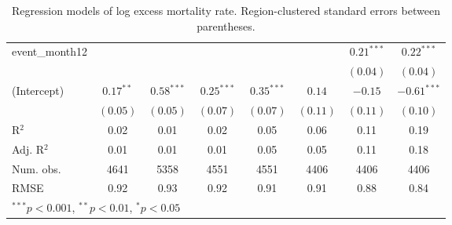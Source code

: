 \begin{table}
\begin{center}
\begin{tabular}{l c c c c c c c }
event\_month12     &              &              &              &              &              & $0.21^{***}$ & $0.22^{***}$  \\
                   &              &              &              &              &              & $(0.04)$     & $(0.04)$      \\
(Intercept)        & $0.17^{**}$  & $0.58^{***}$ & $0.25^{***}$ & $0.35^{***}$ & $0.14$       & $-0.15$      & $-0.61^{***}$ \\
                   & $(0.05)$     & $(0.05)$     & $(0.07)$     & $(0.07)$     & $(0.11)$     & $(0.11)$     & $(0.10)$      \\
\hline
R$^2$              & 0.02         & 0.01         & 0.02         & 0.05         & 0.06         & 0.11         & 0.19          \\
Adj. R$^2$         & 0.01         & 0.01         & 0.01         & 0.05         & 0.05         & 0.11         & 0.18          \\
Num. obs.          & 4641         & 5358         & 4551         & 4551         & 4406         & 4406         & 4406          \\
RMSE               & 0.92         & 0.93         & 0.92         & 0.91         & 0.91         & 0.88         & 0.84          \\
\hline
\multicolumn{8}{l}{\scriptsize{$^{***}p<0.001$, $^{**}p<0.01$, $^*p<0.05$}}
\end{tabular}
\caption{Regression models of log excess mortality rate. Region-clustered standard errors between parentheses.}
\label{tab:basemodels}
\end{center}
\end{table}
